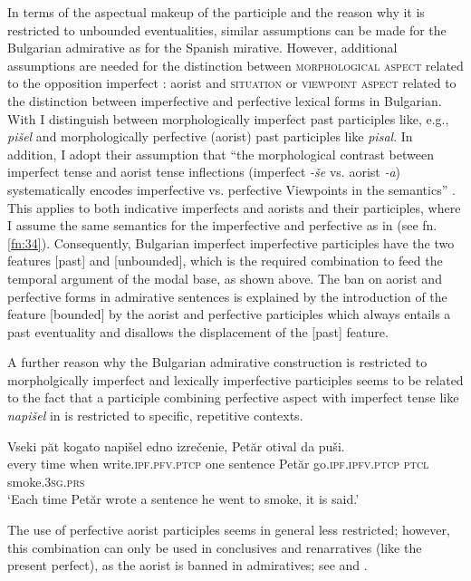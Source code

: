 \documentclass[output=paper,
colorlinks,
citecolor=brown,
newtxmath
]{langscibook}
\begin{document}
In terms of the aspectual makeup of the participle and the reason why it is restricted to unbounded eventualities, similar assumptions can be made for the Bulgarian admirative as for the Spanish mirative. However, additional assumptions are needed for the distinction between \textsc{morphological aspect} related to the opposition imperfect : aorist and \textsc{situation} or \textsc{viewpoint aspect} related to the distinction between imperfective and perfective lexical forms in Bulgarian. With \citet{Rivero.Slavkov2014} I distinguish between morphologically imperfect past participles like, e.g., \textit{pišel} and morphologically perfective (aorist) past participles like \textit{pisal}. In addition, I adopt their assumption that ``the morphological contrast between imperfect tense and aorist tense inflections (imperfect \textit{-še} vs. aorist \textit{-a}) systematically encodes imperfective vs. perfective Viewpoints in the semantics'' \citep[235]{Rivero.Slavkov2014}. This applies to both indicative imperfects and aorists and their participles, where I assume the same semantics for the imperfective and perfective as in \citeauthor{Bustamante2013} (see fn. \ref{fn:34}). Consequently, Bulgarian imperfect imperfective participles have the two features [past] and [unbounded], which is the required combination to feed the temporal argument of the modal base, as shown above. The ban on aorist and perfective forms in admirative sentences is explained by the introduction of the feature [bounded] by the aorist and perfective participles which always entails a past eventuality and disallows the displacement of the [past] feature.

A further reason why the Bulgarian admirative construction is restricted to morpholgically imperfect and lexically imperfective participles seems to be related to the fact that a participle combining perfective aspect with imperfect tense like \textit{napišel} in  is restricted to specific, repetitive contexts.

\ea\label{ex:napisel}
\gll Vseki păt kogato napišel edno izrečenie, Petăr otival da puši.\\
every time when write.\textsc{ipf.pfv.ptcp} one sentence Petăr go.\textsc{ipf.ipfv.ptcp} \textsc{ptcl} smoke.\textsc{3sg.prs}\\
\glt `Each time Petăr wrote a sentence he went to smoke, it is said.'
\z

\noindent The use of perfective aorist participles seems in general less restricted; however, this combination can only be used in conclusives and renarratives (like the present perfect), as the aorist is banned in admiratives; see  and .
\end{document}
